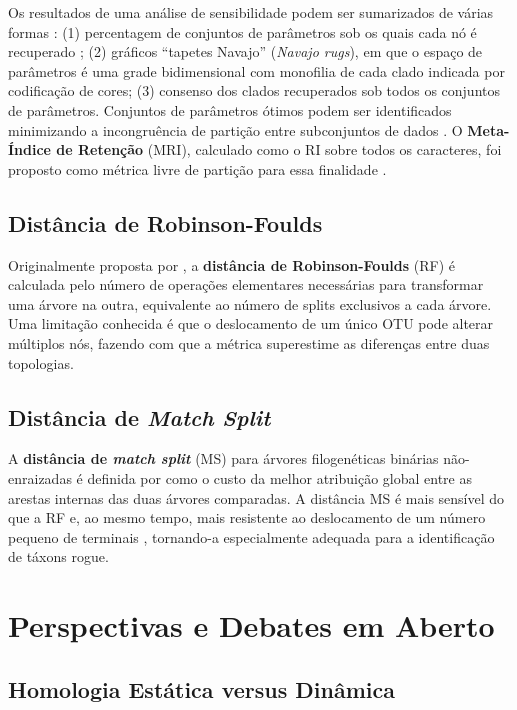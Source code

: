 Os resultados de uma análise de sensibilidade podem ser sumarizados de várias formas \parencite{wheeleretal2006}: (1) percentagem de conjuntos de parâmetros sob os quais cada nó é recuperado \parencite{giribetetal2001}; (2) gráficos ``tapetes Navajo'' (\textit{Navajo rugs}), em que o espaço de parâmetros é uma grade bidimensional com monofilia de cada clado indicada por codificação de cores; (3) consenso dos clados recuperados sob todos os conjuntos de parâmetros. Conjuntos de parâmetros ótimos podem ser identificados minimizando a incongruência de partição entre subconjuntos de dados \parencite{wheeleretal2006}. O \textbf{Meta-Índice de Retenção} (MRI), calculado como o RI sobre todos os caracteres, foi proposto como métrica livre de partição para essa finalidade \parencite{wheeleretal2006}.

\subsection{Distância de Robinson-Foulds}

Originalmente proposta por \textcite{robinson1981}, a \textbf{distância de Robinson-Foulds} (RF) é calculada pelo número de operações elementares necessárias para transformar uma árvore na outra, equivalente ao número de splits exclusivos a cada árvore. Uma limitação conhecida é que o deslocamento de um único OTU pode alterar múltiplos nós, fazendo com que a métrica superestime as diferenças entre duas topologias.

\subsection{Distância de \textit{Match Split}}

A \textbf{distância de \textit{match split}} (MS) para árvores filogenéticas binárias não-enraizadas é definida por \textcite{bogdanowicz2012} como o custo da melhor atribuição global entre as arestas internas das duas árvores comparadas. A distância MS é mais sensível do que a RF e, ao mesmo tempo, mais resistente ao deslocamento de um número pequeno de terminais \parencite{bogdanowicz2012}, tornando-a especialmente adequada para a identificação de táxons rogue.

\section{Perspectivas e Debates em Aberto}
\label{sec:debates}

\subsection{Homologia Estática versus Dinâmica}

